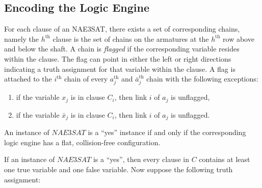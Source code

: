 \subsection{Encoding the Logic Engine}
For each clause of an NAE3SAT, there exists a set of corresponding chains, namely the $h^\text{th}$
clause is the set of chains on the armatures at the $h^\text{th}$ row above and below the shaft. A
chain is \textit{flagged} if the corresponding variable resides within the clause.  The flag can
point in either the left or right directions indicating a truth assignment for that variable within
the clause.  A flag is attached to the $i^\text{th}$ chain of every $a_j^\text{th}$ and
$\bar{a}_j^\text{th}$ chain with the following exceptions:
\begin{enumerate}
 \item if the variable $x_j$  is in clause $C_i$, then link $i$ of $a_j$ is unflagged,
 \item if the variable $\bar{x}_j$ is in clause $C_i$, then link $i$ of $a_j$ is unflagged.
\end{enumerate}
\begin{thm}\label{thm:Satisfiability-1}
 An instance of $NAE3SAT$ is a ``yes'' instance if and only if the corresponding logic engine has a
flat, collision-free configuration.
\end{thm}
\begin{pf}
 If an instance of $NAE3SAT$ is a ``yes'', then every clause in $C$ contains at least one true
variable and one false variable.  Now suppose the following truth assignment:
\end{pf}